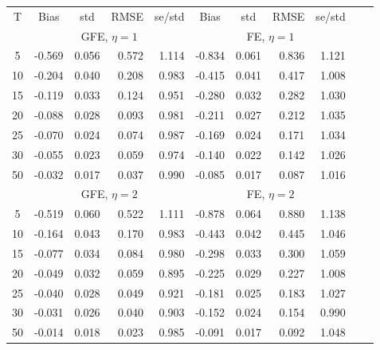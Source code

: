 \begin{tabular}{c r r r r r r r r r r} 
\toprule 
T & \multicolumn{1}{c}{ Bias } & \multicolumn{1}{c}{ std } & \multicolumn{1}{c}{ RMSE } & \multicolumn{1}{c}{ se/std } & \multicolumn{1}{c}{ Bias } & \multicolumn{1}{c}{ std } & \multicolumn{1}{c}{ RMSE } & \multicolumn{1}{c}{ se/std }\\[2pt]
 & \multicolumn{ 4 }{c}{ GFE, $\eta=1$} & \multicolumn{ 4 }{c}{ FE, $\eta=1$}\\[-3pt]
 \cmidrule(lr){2-5}  \cmidrule(lr){6-9}
5 &     -0.569 &      0.056 &      0.572 &      1.114 &     -0.834 &      0.061 &      0.836 &      1.121\\
10 &     -0.204 &      0.040 &      0.208 &      0.983 &     -0.415 &      0.041 &      0.417 &      1.008\\
15 &     -0.119 &      0.033 &      0.124 &      0.951 &     -0.280 &      0.032 &      0.282 &      1.030\\
20 &     -0.088 &      0.028 &      0.093 &      0.981 &     -0.211 &      0.027 &      0.212 &      1.035\\
25 &     -0.070 &      0.024 &      0.074 &      0.987 &     -0.169 &      0.024 &      0.171 &      1.034\\
30 &     -0.055 &      0.023 &      0.059 &      0.974 &     -0.140 &      0.022 &      0.142 &      1.026\\
50 &     -0.032 &      0.017 &      0.037 &      0.990 &     -0.085 &      0.017 &      0.087 &      1.016\\[0pt]
 & \multicolumn{ 4 }{c}{ GFE, $\eta=2$} & \multicolumn{ 4 }{c}{ FE, $\eta=2$}\\[-3pt]
 \cmidrule(lr){2-5}  \cmidrule(lr){6-9}
5 &     -0.519 &      0.060 &      0.522 &      1.111 &     -0.878 &      0.064 &      0.880 &      1.138\\
10 &     -0.164 &      0.043 &      0.170 &      0.983 &     -0.443 &      0.042 &      0.445 &      1.046\\
15 &     -0.077 &      0.034 &      0.084 &      0.980 &     -0.298 &      0.033 &      0.300 &      1.059\\
20 &     -0.049 &      0.032 &      0.059 &      0.895 &     -0.225 &      0.029 &      0.227 &      1.008\\
25 &     -0.040 &      0.028 &      0.049 &      0.921 &     -0.181 &      0.025 &      0.183 &      1.027\\
30 &     -0.031 &      0.026 &      0.040 &      0.903 &     -0.152 &      0.024 &      0.154 &      0.990\\
50 &     -0.014 &      0.018 &      0.023 &      0.985 &     -0.091 &      0.017 &      0.092 &      1.048\\[0pt]
\bottomrule 
\end{tabular}
